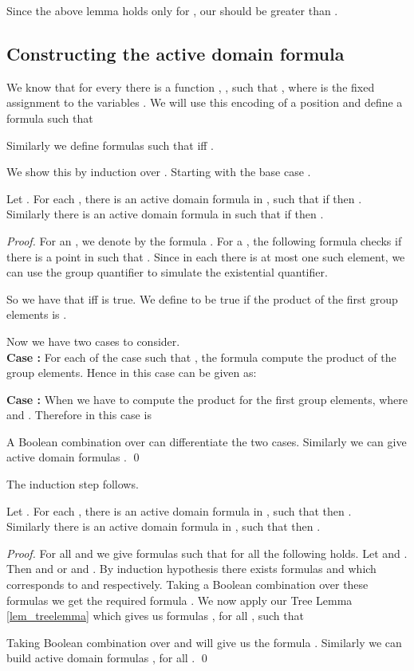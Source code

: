 \documentclass[envcountsame]{llncs}
\begin{document}
Since the above lemma holds only for , our  should be greater than .
 
\subsection{Constructing the active domain formula} 
We know that for every  there is a function , , such that , where  is the fixed assignment to the variables .
We will use this encoding of a position and define a formula  such that 

Similarly we define formulas  such that  iff .

We show this by induction over . Starting with the base case .

\begin{lemma}\label{lem_formbase}
Let .  For each , there is an active domain formula  in , 
such that if  then . \\
Similarly there is an active domain formula  in  such that if  
 then .
\end{lemma}
\begin{proof}
  For an , we denote by  the formula .
For a , the following formula checks if there is a point  in  such that . Since in each  there is at most
one such element, we can use the group quantifier to simulate the existential quantifier.

So we have that  iff  is true. We define  to be true if the product of the first  group elements is . 

Now we have two cases to consider. \\
{\bf Case :} 
For each of the case  such that , the formula  compute the product of the group elements. 
Hence  in this case can be given as:

{\bf Case :} 
When  we have to compute the product for the first  group elements, where  and . Therefore
 in this case is 

A Boolean combination over  can differentiate the two cases.
Similarly we can give active domain formulas .
\qed \end{proof}

The induction step follows.
\begin{lemma}\label{lem_formstep}
  Let . For each , there is an active domain formula  in ,
such that  then . \\
Similarly there is an active domain formula  in ,
such that  then
.
\end{lemma}
\begin{proof}
  For all  and  we give formulas  such that for all  the
  following holds. Let  and . Then 
    and  
  or    and .
  By induction hypothesis there exists formulas  and  which corresponds to 
  and  respectively. Taking a Boolean combination over these formulas we get the required formula .
  We now apply our Tree Lemma \ref{lem_treelemma} which gives us formulas , 
  for all , such that 
   
  Taking Boolean combination over  and  will give us the formula .
Similarly we can build active domain formulas , for all .
\qed \end{proof}
\end{document}
